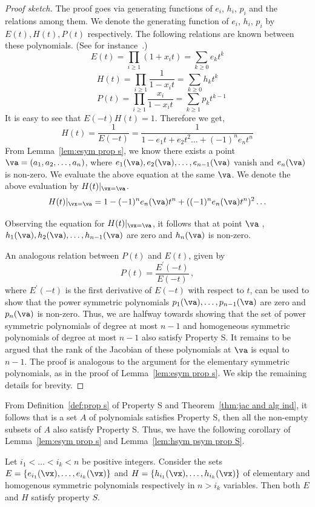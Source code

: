 \begin{proof}[Proof sketch]
	The proof goes via  generating functions of $e_i$, $h_i$, $p_i$ and the relations among them. We denote the generating function of $e_i$, $h_i$, $p_i$ by $E(t),H(t),P(t)$ respectively. The following relations are known between these polynomials. (See for instance~\cite{r28}.)
	$$E(t)= \prod_{i \geq 1} (1+x_it)=\sum_{k \geq 0} e_kt^k$$ 
	$$H(t)=\prod_{i \geq 1} \frac{1}{1-x_it}=\sum_{k \geq 0}  h_kt^k$$
	\quad $$ \quad P(t)=\prod_{i\geq 1}\frac{x_i}{1-x_it}= \sum_{k \geq 1}  p_kt^{k-1}$$
It is easy to see that $E(-t)H(t)=1$.  Therefore we get, 
\begin{equation} \label{equ: h to e gen fun}
H(t)= \frac{1}{E(-t)} =\frac{1}{1-e_1t+e_2t^2 \ldots +(-1)^ne_nt^n}
\end{equation}
From Lemma~\ref{lem:esym prop s}, we know there exists a point $\va=(a_1, a_2, \ldots, a_n)$, where $e_1(\va), e_2(\va), \ldots, e_{n-1}(\va)$ vanish and $e_n(\va)$ is non-zero. We evaluate the above equation at the same $\va$. We denote the above evaluation by $H(t)|_{\vx=\va}$.
$$H(t)|_{\vx=\va}=1- (-1)^ne_n(\va)t^n +((-1)^ne_n(\va)t^n)^2 \ldots $$ 
	
Observing the equation for $H(t)|_{\vx=\va}$, it follows that at point $\va$ , $h_1(\va), h_2(\va), \ldots, h_{n-1}(\va)$ are zero and $h_n(\va)$ is non-zero. %
	
An analogous relation between $P(t)$ and $E(t)$, given by
	  \[
	  P(t)=\frac{E^\prime(-t)}{E(-t)} \, ,
	  \] 
where $E^\prime(-t)$ is the first derivative of $E(-t)$ with respect to $t$, can be used to show that the power symmetric polynomials $p_1(\va),\ldots, p_{n-1}(\va)$ are zero and  $p_n(\va)$ is non-zero. 
%
Thus, we are halfway towards showing that the set of power symmetric polynomials of degree at most $n-1$ and homogeneous symmetric polynomials of degree at most $n-1$ also satisfy Property S. It remains to be argued that the rank of the Jacobian of these polynomials at $\va$ is equal to $n-1$. The proof is analogous to the argument for the elementary symmetric polynomials, as in the proof of Lemma~\ref{lem:esym prop s}. We skip the remaining details for brevity. 
\end{proof}
From Definition~\ref{def:prop s} of Property S and Theorem~\ref{thm:jac and alg ind}, it follows that is a set $A$ of polynomials satisfies Property S, then all the non-empty subsets of $A$ also satisfy Property S. Thus, we have the following corollary of Lemma~\ref{lem:esym prop s} and Lemma~\ref{lem:hsym psym prop S}.
\begin{corollary}\label{cor:prop s subsets}
Let $i_1 < \dots < i_k < n$ be positive integers. Consider the sets $E = \{e_{i_1}(\vx), \dots, e_{i_k}(\vx)\}$ and $H = \{h_{i_1}(\vx), \dots, h_{i_k}(\vx)\}$ of elementary and homogenous symmetric polynomials respectively in $n > i_k$ variables. Then both $E$ and $H$ satisfy property $S$. 
\end{corollary}

